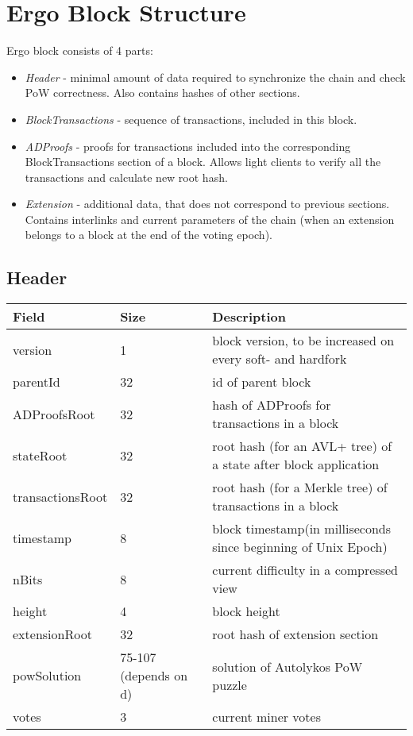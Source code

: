 \section{Ergo Block Structure}
Ergo block consists of 4 parts:

\begin{itemize}
    \item{\em Header } - minimal amount of data required to synchronize the chain and check PoW correctness.
    Also contains hashes of other sections.
    \item{\em BlockTransactions } - sequence of transactions, included in this block.
    \item{\em ADProofs } - proofs for transactions included into the corresponding BlockTransactions section of a block.
    Allows light clients to verify all the transactions and calculate new root hash.
    \item{\em Extension } - additional data, that does not correspond to previous sections.
    Contains interlinks and current parameters of the chain (when an extension belongs to a block at the end of the
    voting epoch).
\end{itemize}

\subsection{Header}
\vspace{1em}
\begin{tabular}{ |p{2.5cm}||p{0.5cm}|p{7.5cm}|  }
    \hline
    \hline
    Field & Size & Description  \\
    \hline
    version  &  1 &  block version, to be increased on every soft- and hardfork  \\
    \hline
    parentId &  32 &  id of parent block  \\
    \hline
    ADProofsRoot &  32 &  hash of ADProofs for transactions in a block \\
    \hline
    stateRoot &  32 &  root hash (for an AVL+ tree) of a state after block application  \\
    \hline
    transactionsRoot  &  32 &  root hash (for a Merkle tree) of transactions in a block  \\
    \hline
    timestamp &  8 &  block timestamp(in milliseconds since beginning of Unix Epoch)  \\
    \hline
    nBits &  8 & current difficulty in a compressed view  \\
    \hline
    height &  4 & block height  \\
    \hline
    extensionRoot & 32 & root hash of extension section  \\
    \hline
    powSolution & 75-107 (depends on d) & solution of Autolykos PoW puzzle  \\
    \hline
    votes & 3 & current miner votes \\
    \hline
\end{tabular}

